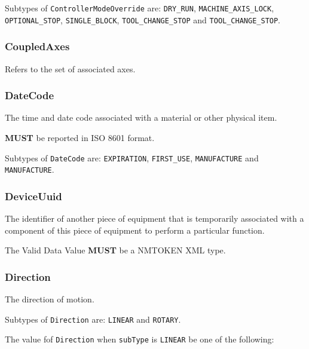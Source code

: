 Subtypes of \texttt{ControllerModeOverride} are: \texttt{DRY_RUN}, \texttt{MACHINE_AXIS_LOCK}, \texttt{OPTIONAL_STOP}, \texttt{SINGLE_BLOCK}, \texttt{TOOL_CHANGE_STOP} and \texttt{TOOL_CHANGE_STOP}. 
\FloatBarrier

\subsubsection{CoupledAxes}
  \label{sec:CoupledAxes}



Refers to the set of associated axes.

\FloatBarrier

\subsubsection{DateCode}
  \label{sec:DateCode}



The time and date code associated with a material or other physical item.
  
  \textbf{MUST} be reported in ISO 8601 format.


Subtypes of \texttt{DateCode} are: \texttt{EXPIRATION}, \texttt{FIRST_USE}, \texttt{MANUFACTURE} and \texttt{MANUFACTURE}. 
\FloatBarrier

\subsubsection{DeviceUuid}
  \label{sec:DeviceUuid}



The identifier of another piece of equipment that is temporarily associated with a component of this piece of equipment to perform a particular function.
  
 The \gls{Valid Data Value} \textbf{MUST} be a NMTOKEN XML type.

\FloatBarrier

\subsubsection{Direction}
  \label{sec:Direction}



The direction of motion.


Subtypes of \texttt{Direction} are: \texttt{LINEAR} and \texttt{ROTARY}. 

The value fof \texttt{Direction} when \texttt{subType} is \texttt{LINEAR} \MUST be one of the following: 

